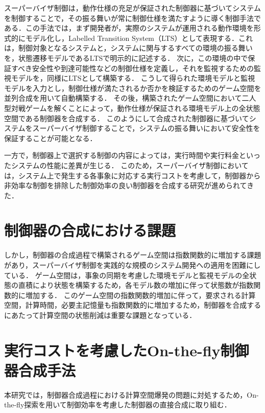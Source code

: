\documentclass[11pt]{jarticle}
\begin{document}
スーパーバイザ制御は，動作仕様の充足が保証された制御器に基づいてシステムを制御することで，その振る舞いが常に制御仕様を満たすように導く制御手法である．この手法では，まず開発者が，実際のシステムが運用される動作環境を形式的にモデル化し，Labelled Transition System（LTS）として表現する．これは，制御対象となるシステムと，システムに関与するすべての環境の振る舞いを，状態遷移モデルであるLTSで明示的に記述する．
次に，この環境の中で保証すべき安全性や到達可能性などの制御仕様を定義し，それを監視するための監視モデルを，同様にLTSとして構築する．
こうして得られた環境モデルと監視モデルを入力とし，制御仕様が満たされるか否かを検証するためのゲーム空間を並列合成を用いて自動構築する．
その後，構築されたゲーム空間において二人型対戦ゲームを解くことによって，動作仕様が保証される環境モデル上の全状態空間である制御器を合成する．
このようにして合成された制御器に基づいてシステムをスーパーバイザ制御することで，システムの振る舞いにおいて安全性を保証することが可能となる．

一方で，制御器上で選択する制御の内容によっては，実行時間や実行料金といったシステムの性能に差異が生じる．
このため，スーパーバイザ制御においては，システム上で発生する各事象に対応する実行コストを考慮して，制御器から非効率な制御を排除した制御効率の良い制御器を合成する研究が進められてきた\cite{eze}．


\section{制御器の合成における課題}
しかし，制御器の合成過程で構築されるゲーム空間は指数関数的に増加する課題があり，スーパーバイザ制御を実践的な規模のシステム開発への適用を困難にしている．
ゲーム空間は，事象の同期を考慮した環境モデルと監視モデルの全状態の直積により状態を構築するため，各モデル数の増加に伴って状態数が指数関数的に増加する．
このゲーム空間の指数関数的増加に伴って，要求される計算空間，計算時間，必要主記憶量も指数関数的に増加するため，制御器を合成するにあたって計算空間の状態削減は重要な課題となっている．


\section{実行コストを考慮したOn-the-fly制御器合成手法}
本研究では，制御器合成過程における計算空間爆発の問題に対処するため，On-the-fly探索を用いて制御効率を考慮した制御器の直接合成に取り組む．
\end{document}
